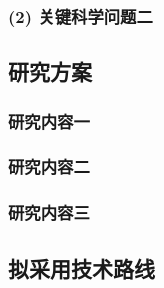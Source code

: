 \documentclass[UTF8,12pt,AutoFakeBold=2]{ctexart}
\begin{document}
\subsubsection*{(2) 关键科学问题二}


\subsection{研究方案}

\subsubsection{研究内容一}

\subsubsection{研究内容二}

\subsubsection{研究内容三}

\subsection{拟采用技术路线}
\end{document}
